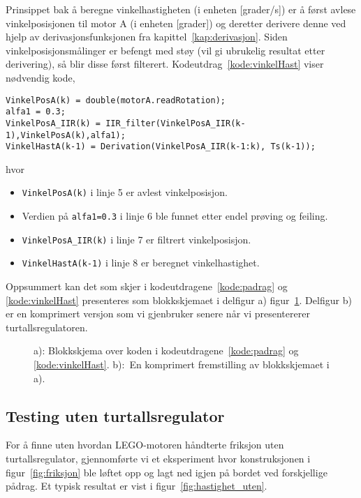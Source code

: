 Prinsippet bak å beregne vinkel\-hastigheten (i enheten [grader/s])
er å først avlese vinkelposisjonen til motor A (i enheten [grader]) og
deretter derivere denne ved hjelp av derivasjonsfunksjonen fra 
kapittel~\ref{kap:derivasjon}. Siden 
vinkelposisjonsmålinger er befengt med støy (vil gi ubrukelig resultat
etter derivering), så blir 
disse først filterert. Kodeutdrag~\ref{kode:vinkelHast} viser
nødvendig kode,
\begin{lstlisting}[caption=Kode for beregning av vinkelhastighet til
  motor A., label=kode:vinkelHast, firstnumber=5]
VinkelPosA(k) = double(motorA.readRotation);
alfa1 = 0.3;
VinkelPosA_IIR(k) = IIR_filter(VinkelPosA_IIR(k-1),VinkelPosA(k),alfa1);
VinkelHastA(k-1) = Derivation(VinkelPosA_IIR(k-1:k), Ts(k-1));
\end{lstlisting}
hvor
\begin{itemize}
  \setlength\itemsep{-1mm}
\item {\tt  VinkelPosA(k)} i linje 5 er avlest vinkelposisjon.
  \item Verdien på {\tt alfa1=0.3} i linje 6 ble funnet etter endel prøving og
    feiling.
\item {\tt  VinkelPosA\_IIR(k)} i linje 7 er filtrert vinkelposisjon.
\item {\tt  VinkelHastA(k-1)} i linje 8 er beregnet vinkelhastighet.
\end{itemize}

Oppsummert kan det som skjer i
kodeutdragene~\ref{kode:padrag} og \ref{kode:vinkelHast} presenteres som
blokkskjemaet i delfigur a) figur~\ref{fig:open_sloyfe}. Delfigur b)
er en komprimert versjon som vi gjenbruker senere når vi presentererer
turtallsregulatoren. 
\begin{figure}[H]
  \centering
  \caption{a): Blokkskjema over koden i
    kodeutdragene~\ref{kode:padrag} og \ref{kode:vinkelHast}. b):~En komprimert fremstilling av
    blokkskjemaet i a). } 
  \label{fig:open_sloyfe}
\end{figure}

\subsection{Testing uten turtallsregulator}
For å finne uten hvordan LEGO-motoren håndterte friksjon uten
turtallsregulator, gjennomførte vi et eksperiment 
hvor konstruksjonen i figur~\ref{fig:friksjon} ble løftet opp og lagt
ned igjen på bordet ved forskjellige pådrag. Et typisk resultat er
vist i  figur~\ref{fig:hastighet_uten}.

